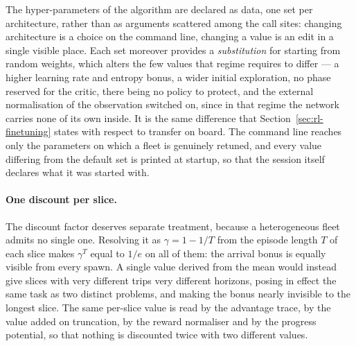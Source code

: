 The hyper-parameters of the algorithm are declared as data, one set per
architecture, rather than as arguments scattered among the call sites: changing
architecture is a choice on the command line, changing a value is an edit in a
single visible place. Each set moreover provides a \emph{substitution} for
starting from random weights, which alters the few values that regime requires
to differ --- a higher learning rate and entropy bonus, a wider initial
exploration, no phase reserved for the critic, there being no policy to protect,
and the external normalisation of the observation switched on, since in that
regime the network carries none of its own inside. It is the same difference
that Section~\ref{sec:rl-finetuning} states with respect to transfer on board.
The command line reaches only the parameters on which a fleet is genuinely
retuned, and every value differing from the default set is printed at startup,
so that the session itself declares what it was started with.

\paragraph{One discount per slice.}
The discount factor deserves separate treatment, because a heterogeneous fleet
admits no single one. Resolving it as $\gamma = 1 - 1/T$ from the episode length
$T$ of each slice makes $\gamma^{T}$ equal to $1/e$ on all of them: the arrival
bonus is equally visible from every spawn. A single value derived from the mean
would instead give slices with very different trips very different horizons,
posing in effect the same task as two distinct problems, and making the bonus
nearly invisible to the longest slice. The same per-slice value is read by the
advantage trace, by the value added on truncation, by the reward normaliser and
by the progress potential, so that nothing is discounted twice with two
different values.
